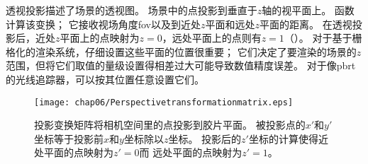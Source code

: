 透视投影描述了场景的透视图。
场景中的点投影到垂直于$z$轴的视平面上。
函数计算该变换；
它接收视场角度{\ttfamily fov}以及到近处$z$平面和远处$z$平面的距离。
在透视投影后，近处$z$平面上的点映射为$z=0$，远处平面上的点则有$z=1$（）。
对于基于栅格化的渲染系统，仔细设置这些平面的位置很重要；
它们决定了要渲染的场景的$z$范围，但将它们取值的量级设置得相差过大可能导致数值精度误差。
对于像pbrt的光线追踪器，可以按其位置任意设置它们。
\begin{figure}[htbp]
    \centering\texttt{[image: chap06/Perspectivetransformationmatrix.eps]}
    \caption{投影变换矩阵将相机空间里的点投影到胶片平面。
        被投影点的$x'$和$y'$坐标等于投影前$x$和$y$坐标除以$z$坐标。
        投影后的$z'$坐标的计算使得近处平面的点映射为$z'=0$而
        远处平面的点映射为$z'=1$。}
    \label{fig:6.5}
\end{figure}


